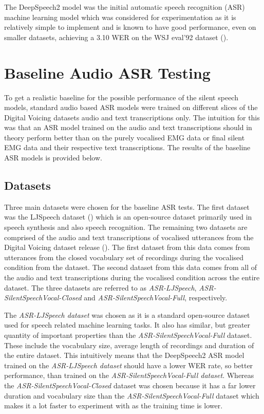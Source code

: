 The DeepSpeech2 model was the initial automatic speech recognition (ASR) machine
learning model which was considered for experimentation as it is relatively simple to
implement and is known to have good performance, even on smaller datasets, achieving
a 3.10 WER on the WSJ eval'92 dataset
(\cite{DS2_original}).

\section{Baseline Audio ASR Testing}

To get a realistic baseline for the possible performance of the silent
speech models, standard audio based ASR models were trained on different
slices of the Digital Voicing datasets audio and text transcriptions only.
The intuition for this was that an ASR model trained on the audio and text
transcriptions should in theory perform better than on the purely vocalised
EMG data or final silent EMG data and their respective text transcriptions.
The results of the baseline ASR models is provided below.

\subsection{Datasets}

Three main datasets were chosen for the baseline ASR tests. The first dataset
was the LJSpeech dataset
(\cite{ljspeech17})
which is an open-source dataset primarily used in
speech synthesis and also speech recognition. The remaining two datasets
are comprised of the audio and text transcriptions of vocalised
utterances from the Digital Voicing dataset release (\cite{gaddy2020digital}).
The first dataset from this data comes from utterances from the closed
vocabulary set of recordings during the vocalised condition from the dataset.
The second dataset from this data comes from
all of the audio and text transcriptions during the vocalised condition across
the entire dataset. The three datasets are referred to as
\textit{ASR-LJSpeech}, \textit{ASR-SilentSpeechVocal-Closed} and
\textit{ASR-SilentSpeechVocal-Full},
respectively.

The \textit{ASR-LJSpeech dataset} was chosen as it is a standard open-source dataset
used for speech related machine learning tasks. It also has similar, but greater
quantity of important properties than the \textit{ASR-SilentSpeechVocal-Full} dataset.
These include the vocabulary size,
average length of recordings and duration of the entire dataset. This intuitively
means that the DeepSpeech2 ASR model trained on the \textit{ASR-LJSpeech dataset} should
have a lower WER rate, so better performance, than trained on
the \textit{ASR-SilentSpeechVocal-Full dataset}.
Whereas the \textit{ASR-SilentSpeechVocal-Closed} dataset was chosen because it has
a far lower duration and vocabulary size than the \textit{ASR-SilentSpeechVocal-Full}
dataset which makes it a lot faster to experiment with as the training time is
lower.


